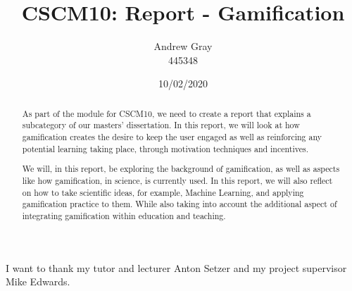 \documentclass[11pt, a4paper, twoside, openright]{custard}
\begin{document}
	
	\title{CSCM10: Report - Gamification}
	\author{Andrew Gray\protect\\{\normalsize 445348}}
	
	
	
	\date{10/02/2020}
	
	\frontmatter%
	\maketitle
	\cleardoublepage

	\begin{abstract}
		\vspace{-2em}
		\setcounter{page}{1}
		
		As part of the module for CSCM10, we need to create a report that explains a subcategory of our masters' dissertation. In this report, we will look at how gamification creates the desire to keep the user engaged as well as reinforcing any potential learning taking place, through motivation techniques and incentives.  
		
		We will, in this report, be exploring the background of gamification, as well as aspects like how gamification, in science, is currently used. In this report, we will also reflect on how to take scientific ideas, for example, Machine Learning, and applying gamification practice to them. While also taking into account the additional aspect of integrating gamification within education and teaching.
	\end{abstract}
	
	\begin{Acknowledgements}
		I want to thank my tutor and lecturer Anton Setzer and my project supervisor Mike Edwards. 
	\end{Acknowledgements}
	
\end{document}
